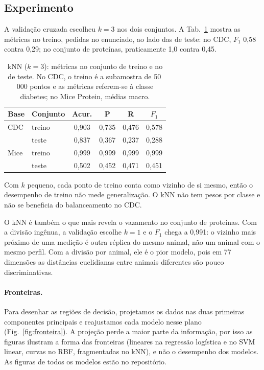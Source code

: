 \documentclass[aps,pre,twocolumn,10pt,nofootinbib]{revtex4-2}
\begin{document}
\subsection{Experimento}
A validação cruzada escolheu $k=3$ nos dois conjuntos. A
Tab.~\ref{tab:knn} mostra as métricas no treino, pedidas no enunciado, ao
lado das de teste: no CDC, $F_1$ 0,58 contra 0,29; no conjunto de
proteínas, praticamente 1,0 contra 0,45.

\begin{table}[t]
\caption{kNN ($k=3$): métricas no conjunto de treino e no de teste. No CDC,
o treino é a subamostra de 50\,000 pontos e as métricas referem-se à classe
diabetes; no Mice Protein, médias macro.}
\label{tab:knn}
\begin{ruledtabular}
\begin{tabular}{llcccc}
Base & Conjunto & Acur. & P & R & $F_1$ \\
\hline
CDC  & treino & 0,903 & 0,735 & 0,476 & 0,578 \\
     & teste  & 0,837 & 0,367 & 0,237 & 0,288 \\
\hline
Mice & treino & 0,999 & 0,999 & 0,999 & 0,999 \\
     & teste  & 0,502 & 0,452 & 0,471 & 0,451 \\
\end{tabular}
\end{ruledtabular}
\end{table} Com $k$ pequeno, cada
ponto de treino conta como vizinho de si mesmo, então o desempenho de
treino não mede generalização. O kNN não tem pesos por classe e não se
beneficia do balanceamento no CDC.

O kNN é também o que mais revela o vazamento no conjunto de proteínas. Com
a divisão ingênua, a validação escolhe $k=1$ e o $F_1$ chega a 0,991: o
vizinho mais próximo de uma medição é outra réplica do mesmo animal, não um
animal com o mesmo perfil. Com a divisão por animal, ele é o pior modelo,
pois em 77 dimensões as distâncias euclidianas entre animais diferentes são
pouco discriminativas.

\paragraph{Fronteiras.}
Para desenhar as regiões de decisão, projetamos os dados nas duas primeiras
componentes principais e reajustamos cada modelo nesse plano
(Fig.~\ref{fig:fronteira}). A projeção perde a maior parte da informação,
por isso as figuras ilustram a forma das fronteiras (lineares na regressão
logística e no SVM linear, curvas no RBF, fragmentadas no kNN), e não o
desempenho dos modelos. As figuras de todos os modelos estão no repositório.
\end{document}
